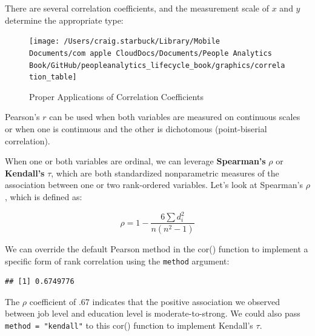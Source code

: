 \documentclass[]{book}
\newenvironment{Shaded}{\begin{snugshade}}{\end{snugshade}}
\newcommand{\CommentTok}[1]{\textcolor[rgb]{0.56,0.35,0.01}{\textit{#1}}}
\newcommand{\DataTypeTok}[1]{\textcolor[rgb]{0.13,0.29,0.53}{#1}}
\newcommand{\KeywordTok}[1]{\textcolor[rgb]{0.13,0.29,0.53}{\textbf{#1}}}
\newcommand{\NormalTok}[1]{#1}
\newcommand{\OperatorTok}[1]{\textcolor[rgb]{0.81,0.36,0.00}{\textbf{#1}}}
\newcommand{\StringTok}[1]{\textcolor[rgb]{0.31,0.60,0.02}{#1}}
\begin{document}
There are several correlation coefficients, and the measurement scale of \(x\) and \(y\) determine the appropriate type:

\begin{figure}

{\centering \texttt{[image: /Users/craig.starbuck/Library/Mobile Documents/com~apple~CloudDocs/Documents/People Analytics Book/GitHub/peopleanalytics\_lifecycle\_book/graphics/correlation\_table]} 

}

\caption{Proper Applications of Correlation Coefficients}\label{fig:corr-table}
\end{figure}

Pearson's \(r\) can be used when both variables are measured on continuous scales or when one is continuous and the other is dichotomous (point-biserial correlation).

When one or both variables are ordinal, we can leverage \textbf{Spearman's} \(\rho\) or \textbf{Kendall's} \(\tau\), which are both standardized nonparametric measures of the association between one or two rank-ordered variables. Let's look at Spearman's \(\rho\), which is defined as:

\[ \rho = 1 - {\frac {6 \sum d_i^2}{n(n^2 - 1)}} \]

We can override the default Pearson method in the cor() function to implement a specific form of rank correlation using the \texttt{method} argument:

\begin{Shaded}
\end{Shaded}

\begin{verbatim}
## [1] 0.6749776
\end{verbatim}

The \(\rho\) coefficient of .67 indicates that the positive association we observed between job level and education level is moderate-to-strong. We could also pass \texttt{method\ =\ "kendall"} to this cor() function to implement Kendall's \(\tau\).
\end{document}
